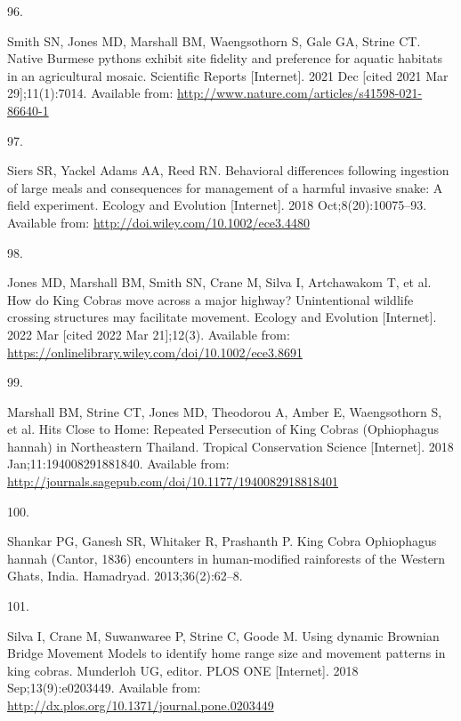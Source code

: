 \documentclass[10pt,a4paper]{article}
\newlength{\cslhangindent}
\newlength{\csllabelwidth}
\newlength{\cslentryspacingunit} %
\newenvironment{CSLReferences}[2] %
 {%
  \setlength{\parindent}{0pt}
  \ifodd #1
  \let\oldpar\par
  \def\par{\hangindent=\cslhangindent\oldpar}
  \fi
  \setlength{\parskip}{#2\cslentryspacingunit}
 }%
 {}
\newcommand{\CSLLeftMargin}[1]{\parbox[t]{\csllabelwidth}{#1}}
\newcommand{\CSLRightInline}[1]{\parbox[t]{\linewidth - \csllabelwidth}{#1}\break}
\begin{document}
\begin{CSLReferences}{0}{0}
\leavevmode{}%
\CSLLeftMargin{96. }
\CSLRightInline{Smith SN, Jones MD, Marshall BM, Waengsothorn S, Gale GA, Strine CT. Native {Burmese} pythons exhibit site fidelity and preference for aquatic habitats in an agricultural mosaic. Scientific Reports {[}Internet{]}. 2021 Dec {[}cited 2021 Mar 29{]};11(1):7014. Available from: \url{http://www.nature.com/articles/s41598-021-86640-1}}

\leavevmode{}%
\CSLLeftMargin{97. }
\CSLRightInline{Siers SR, Yackel Adams AA, Reed RN. Behavioral differences following ingestion of large meals and consequences for management of a harmful invasive snake: {A} field experiment. Ecology and Evolution {[}Internet{]}. 2018 Oct;8(20):10075--93. Available from: \url{http://doi.wiley.com/10.1002/ece3.4480}}

\leavevmode{}%
\CSLLeftMargin{98. }
\CSLRightInline{Jones MD, Marshall BM, Smith SN, Crane M, Silva I, Artchawakom T, et al. How do {King} {Cobras} move across a major highway? {Unintentional} wildlife crossing structures may facilitate movement. Ecology and Evolution {[}Internet{]}. 2022 Mar {[}cited 2022 Mar 21{]};12(3). Available from: \url{https://onlinelibrary.wiley.com/doi/10.1002/ece3.8691}}

\leavevmode{}%
\CSLLeftMargin{99. }
\CSLRightInline{Marshall BM, Strine CT, Jones MD, Theodorou A, Amber E, Waengsothorn S, et al. Hits {Close} to {Home}: {Repeated} {Persecution} of {King} {Cobras} ({Ophiophagus} hannah) in {Northeastern} {Thailand}. Tropical Conservation Science {[}Internet{]}. 2018 Jan;11:194008291881840. Available from: \url{http://journals.sagepub.com/doi/10.1177/1940082918818401}}

\leavevmode{}%
\CSLLeftMargin{100. }
\CSLRightInline{Shankar PG, Ganesh SR, Whitaker R, Prashanth P. King {Cobra} {Ophiophagus} hannah ({Cantor}, 1836) encounters in human-modified rainforests of the {Western} {Ghats}, {India}. Hamadryad. 2013;36(2):62--8. }

\leavevmode{}%
\CSLLeftMargin{101. }
\CSLRightInline{Silva I, Crane M, Suwanwaree P, Strine C, Goode M. Using dynamic {Brownian} {Bridge} {Movement} {Models} to identify home range size and movement patterns in king cobras. Munderloh UG, editor. PLOS ONE {[}Internet{]}. 2018 Sep;13(9):e0203449. Available from: \url{http://dx.plos.org/10.1371/journal.pone.0203449}}

\end{CSLReferences}
\end{document}
